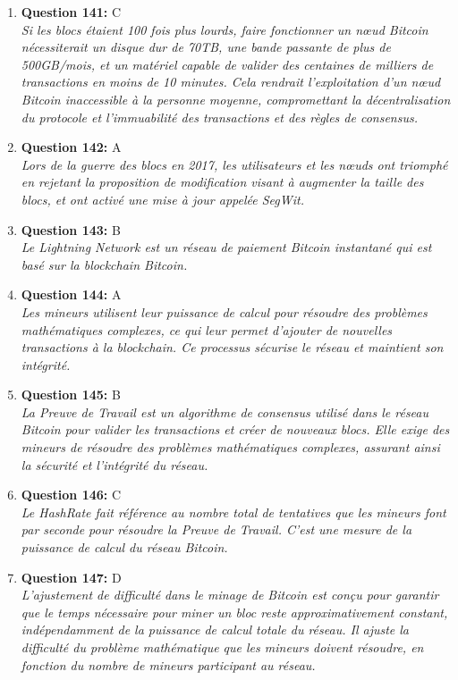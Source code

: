 \documentclass[12pt,a4paper]{article}
\begin{document}
\begin{enumerate}
\item \textbf{Question 141:} C
\\ \textit{Si les blocs étaient 100 fois plus lourds, faire fonctionner un nœud Bitcoin nécessiterait un disque dur de 70TB, une bande passante de plus de 500GB/mois, et un matériel capable de valider des centaines de milliers de transactions en moins de 10 minutes. Cela rendrait l'exploitation d'un nœud Bitcoin inaccessible à la personne moyenne, compromettant la décentralisation du protocole et l'immuabilité des transactions et des règles de consensus.}

\item \textbf{Question 142:} A
\\ \textit{Lors de la guerre des blocs en 2017, les utilisateurs et les nœuds ont triomphé en rejetant la proposition de modification visant à augmenter la taille des blocs, et ont activé une mise à jour appelée SegWit.}

\item \textbf{Question 143:} B
\\ \textit{Le Lightning Network est un réseau de paiement Bitcoin instantané qui est basé sur la blockchain Bitcoin.}

\item \textbf{Question 144:} A
\\ \textit{Les mineurs utilisent leur puissance de calcul pour résoudre des problèmes mathématiques complexes, ce qui leur permet d'ajouter de nouvelles transactions à la blockchain. Ce processus sécurise le réseau et maintient son intégrité.}

\item \textbf{Question 145:} B
\\ \textit{La Preuve de Travail est un algorithme de consensus utilisé dans le réseau Bitcoin pour valider les transactions et créer de nouveaux blocs. Elle exige des mineurs de résoudre des problèmes mathématiques complexes, assurant ainsi la sécurité et l'intégrité du réseau.}

\item \textbf{Question 146:} C
\\ \textit{Le HashRate fait référence au nombre total de tentatives que les mineurs font par seconde pour résoudre la Preuve de Travail. C'est une mesure de la puissance de calcul du réseau Bitcoin.}

\item \textbf{Question 147:} D
\\ \textit{L'ajustement de difficulté dans le minage de Bitcoin est conçu pour garantir que le temps nécessaire pour miner un bloc reste approximativement constant, indépendamment de la puissance de calcul totale du réseau. Il ajuste la difficulté du problème mathématique que les mineurs doivent résoudre, en fonction du nombre de mineurs participant au réseau.}


\end{enumerate}
\end{document}

